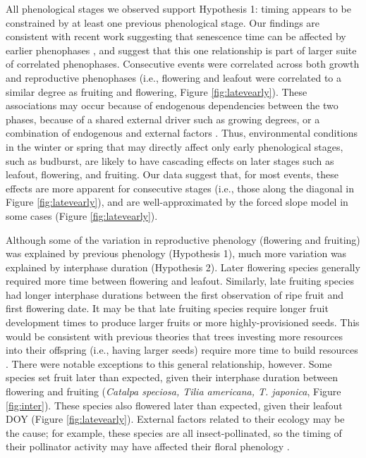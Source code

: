 \documentclass{article}
\begin{document}
\par All phenological stages we observed support Hypothesis 1: timing appears to be constrained by at least one previous phenological stage. Our findings are consistent with recent work suggesting that senescence time can be affected by earlier phenophases \citep{keenan2015,liu2016}, and suggest that this one relationship is part of larger suite of correlated phenophases. Consecutive events were correlated across both growth and reproductive phenophases (i.e., flowering and leafout were correlated to a similar degree as fruiting and flowering, Figure \ref{fig:latevearly}). These associations may occur because of endogenous dependencies between the two phases, because of a shared external driver such as growing degrees, or a combination of endogenous and external factors \citep{lechowicz1995}. Thus, environmental conditions in the winter or spring that may directly affect only early phenological stages, such as budburst, are likely to have cascading effects on later stages such as leafout, flowering, and fruiting. Our data suggest that, for most events, these effects are more apparent for consecutive stages (i.e., those along the diagonal in Figure \ref{fig:latevearly}), and are well-approximated by the forced slope model in some cases (Figure \ref{fig:latevearly}).

\par Although some of the variation in reproductive phenology (flowering and fruiting) was explained by previous phenology (Hypothesis 1), much more variation was explained by interphase duration (Hypothesis 2). Later flowering species generally required more time between flowering and leafout. Similarly, late fruiting species had longer interphase durations between the first observation of ripe fruit and first flowering date. It may be that late fruiting species require longer fruit development times to produce larger fruits or more highly-provisioned seeds. This would be consistent with previous theories that trees investing more resources into their offspring (i.e., having larger seeds) require more time to build resources \citep{bolmgren2008,sun2011}. There were notable exceptions to this general relationship, however. Some species set fruit later than expected, given their interphase duration between flowering and fruiting (\textit{Catalpa speciosa, Tilia americana, T. japonica}, Figure \ref{fig:inter}). These species also flowered later than expected, given their leafout DOY (Figure \ref{fig:latevearly}). External factors related to their ecology may be the cause; for example, these species are all insect-pollinated, so the timing of their pollinator activity may have affected their floral phenology \citep{elzinga2007}. %
\end{document}
